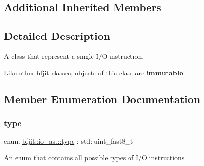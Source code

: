 \subsection*{Additional Inherited Members}


\subsection{Detailed Description}
A class that represent a single I/O instruction. 

Like other \hyperlink{namespacebfjit}{bfjit} classes, objects of this class are {\bfseries immutable}. 

\subsection{Member Enumeration Documentation}
\hypertarget{classbfjit_1_1io__ast_ae0b93ddde6f86aed45dd22b72d290414}{}\label{classbfjit_1_1io__ast_ae0b93ddde6f86aed45dd22b72d290414} 
\subsubsection{\texorpdfstring{type}{type}}
{\footnotesize\ttfamily enum \hyperlink{classbfjit_1_1io__ast_ae0b93ddde6f86aed45dd22b72d290414}{bfjit\+::io\+\_\+ast\+::type} \+: std\+::uint\+\_\+fast8\+\_\+t\hspace{0.3cm}{\ttfamily [strong]}}



An enum that contains all possible types of I/O instructions. 

